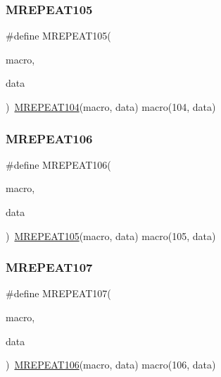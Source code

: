 \mbox{\label{group__group__sam0__utils__mrepeat_ga8df0585384d0052a9a2009876cd18459}} 
\subsubsection{\texorpdfstring{MREPEAT105}{MREPEAT105}}
{\footnotesize\ttfamily \#define M\+R\+E\+P\+E\+A\+T105(\begin{DoxyParamCaption}\item[{}]{macro,  }\item[{}]{data }\end{DoxyParamCaption})~\mbox{\hyperlink{group__group__sam0__utils__mrepeat_ga22151fc326d5feb28b754cbc581902e1}{M\+R\+E\+P\+E\+A\+T104}}(macro, data)   macro(104, data)}

\mbox{\label{group__group__sam0__utils__mrepeat_ga65c66d814f582f426c18794de01f4475}} 
\subsubsection{\texorpdfstring{MREPEAT106}{MREPEAT106}}
{\footnotesize\ttfamily \#define M\+R\+E\+P\+E\+A\+T106(\begin{DoxyParamCaption}\item[{}]{macro,  }\item[{}]{data }\end{DoxyParamCaption})~\mbox{\hyperlink{group__group__sam0__utils__mrepeat_ga8df0585384d0052a9a2009876cd18459}{M\+R\+E\+P\+E\+A\+T105}}(macro, data)   macro(105, data)}

\mbox{\label{group__group__sam0__utils__mrepeat_ga0cddcc3fa390ae9e30eaf07e9223be42}} 
\subsubsection{\texorpdfstring{MREPEAT107}{MREPEAT107}}
{\footnotesize\ttfamily \#define M\+R\+E\+P\+E\+A\+T107(\begin{DoxyParamCaption}\item[{}]{macro,  }\item[{}]{data }\end{DoxyParamCaption})~\mbox{\hyperlink{group__group__sam0__utils__mrepeat_ga65c66d814f582f426c18794de01f4475}{M\+R\+E\+P\+E\+A\+T106}}(macro, data)   macro(106, data)}

